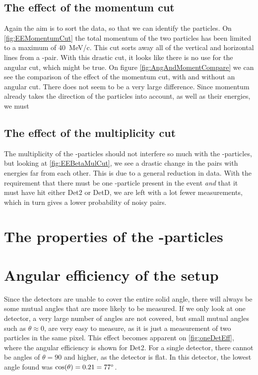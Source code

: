 \subsection{The effect of the momentum cut}
Again the aim is to sort the data, so that we can identify the particles. On \cref{fig:EEMomentumCut} the total momentum of the two particles has been limited to a maximum of \SI{40}{MeV/c}. This cut sorts away all of the vertical and horizontal lines from a \be-\al pair. With this drastic cut, it looks like there is no use for the angular cut, which might be true. On figure \ref{fig:AngAndMomentCompare} we can see the comparison of the effect of the momentum cut, with and without an angular cut. There does not seem to be a very large difference. Since momentum already takes the direction of the particles into account, as well as their energies, we must 





\subsection{The effect of the multiplicity cut}
The multiplicity of the \be-particles should not interfere so much with the \al-particles, but looking at \cref{fig:EEBetaMulCut}, we see a drastic change in the pairs with energies far from each other. This is due to a general reduction in data. With the requirement that there must be one \be-particle present in the event \textit{and} that it must have hit either Det2 or DetD, we are left with a lot fewer measurements, which in turn gives a lower probability of noisy pairs. 

\begin{figure}[h]

\end{figure}
\section{The properties of the \al-particles}


\section{Angular efficiency of the setup}
Since the detectors are unable to cover the entire solid angle, there will always be some mutual angles that are more likely to be measured. 
If we only look at one detector, a very large number of angles are not covered, but small mutual angles such as $\theta \approx 0$, are very easy to measure, as it is just a measurement of two particles in the same pixel. 
This effect becomes apparent on \cref{fig:oneDetEff}, where the angular efficiency is shown for Det2. For a single detector, there cannot be angles of $\theta = 90$ and higher, as the detector is flat. In this detector, the lowest angle found was $\cos(\theta) = 0.21 = 77\degree$.\\

